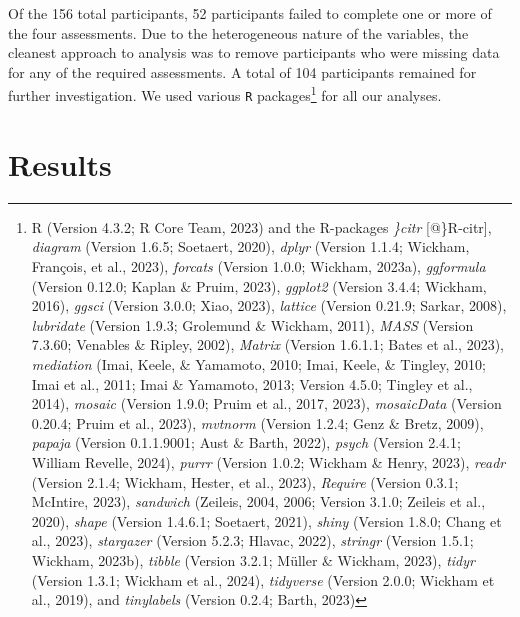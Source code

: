\documentclass[
  man,floatsintext]{apa7}
\begin{document}
Of the 156 total participants, 52 participants failed to complete one or more of the four assessments. Due to the heterogeneous nature of the variables, the cleanest approach to analysis was to remove participants who were missing data for any of the required assessments. A total of 104 participants remained for further investigation. We used various \texttt{R} packages\footnote{R (Version 4.3.2; R Core Team, 2023) and the R-packages \emph{\}citr} {[}@\}R-citr{]}, \emph{diagram} (Version 1.6.5; Soetaert, 2020), \emph{dplyr} (Version 1.1.4; Wickham, François, et al., 2023), \emph{forcats} (Version 1.0.0; Wickham, 2023a), \emph{ggformula} (Version 0.12.0; Kaplan \& Pruim, 2023), \emph{ggplot2} (Version 3.4.4; Wickham, 2016), \emph{ggsci} (Version 3.0.0; Xiao, 2023), \emph{lattice} (Version 0.21.9; Sarkar, 2008), \emph{lubridate} (Version 1.9.3; Grolemund \& Wickham, 2011), \emph{MASS} (Version 7.3.60; Venables \& Ripley, 2002), \emph{Matrix} (Version 1.6.1.1; Bates et al., 2023), \emph{mediation} (Imai, Keele, \& Yamamoto, 2010; Imai, Keele, \& Tingley, 2010; Imai et al., 2011; Imai \& Yamamoto, 2013; Version 4.5.0; Tingley et al., 2014), \emph{mosaic} (Version 1.9.0; Pruim et al., 2017, 2023), \emph{mosaicData} (Version 0.20.4; Pruim et al., 2023), \emph{mvtnorm} (Version 1.2.4; Genz \& Bretz, 2009), \emph{papaja} (Version 0.1.1.9001; Aust \& Barth, 2022), \emph{psych} (Version 2.4.1; William Revelle, 2024), \emph{purrr} (Version 1.0.2; Wickham \& Henry, 2023), \emph{readr} (Version 2.1.4; Wickham, Hester, et al., 2023), \emph{Require} (Version 0.3.1; McIntire, 2023), \emph{sandwich} (Zeileis, 2004, 2006; Version 3.1.0; Zeileis et al., 2020), \emph{shape} (Version 1.4.6.1; Soetaert, 2021), \emph{shiny} (Version 1.8.0; Chang et al., 2023), \emph{stargazer} (Version 5.2.3; Hlavac, 2022), \emph{stringr} (Version 1.5.1; Wickham, 2023b), \emph{tibble} (Version 3.2.1; Müller \& Wickham, 2023), \emph{tidyr} (Version 1.3.1; Wickham et al., 2024), \emph{tidyverse} (Version 2.0.0; Wickham et al., 2019), and \emph{tinylabels} (Version 0.2.4; Barth, 2023)} for all our analyses.

\hypertarget{results}{%
\section{Results}\label{results}}
\end{document}
